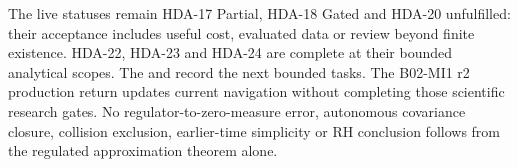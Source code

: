 The live statuses remain HDA-17 Partial, HDA-18 Gated and HDA-20
unfulfilled: their acceptance includes useful cost, evaluated data or
review beyond finite existence. HDA-22, HDA-23 and HDA-24 are complete
at their bounded analytical scopes. The
and 
record the next bounded tasks. The B02-MI1 r2 production return updates current navigation without
completing those scientific research gates.
No regulator-to-zero-measure error, autonomous covariance closure,
collision exclusion, earlier-time simplicity or RH conclusion follows
from the regulated approximation theorem alone.
